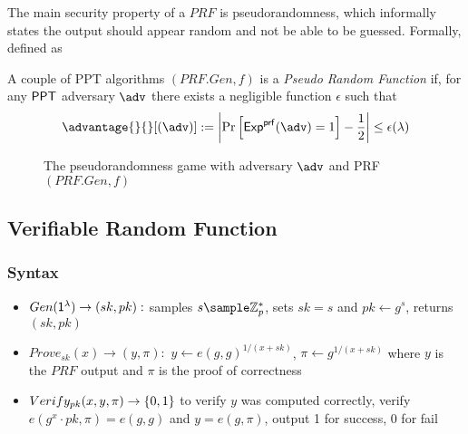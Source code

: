 The main security property of a $PRF$ is pseudorandomness, which informally states the output should appear random and not be able to be guessed. Formally, defined as

\begin{definition}[Pseudorandomness]
    A couple of PPT algorithms $(PRF.Gen, f)$ is a \textit{Pseudo Random Function} if, for any $\mathsf{PPT}$ adversary $\adv$ there exists a negligible function $\epsilon$ such that 
    \[
    \advantage{}{}[(\adv)] := 
        \left|
    \Pr     \left[ 
                \mathsf{Exp}^{\mathsf{prf}}(\adv) = 1
            \right] - \frac{1}{2}
        \right| \leq \epsilon(\lambda)
    \]
\end{definition}

\begin{figure}
\begin{pchstack}[boxed, center, space=1em]
\end{pchstack}
  \caption{The pseudorandomness game with adversary $\adv$ and PRF $(PRF.Gen, f)$}
  \label{fig:prf}
\end{figure}


\subsection{Verifiable Random Function}

\subsubsection{Syntax}
\begin{itemize}
    \item $Gen(\mathsf{1^{\lambda}}) \to (sk, pk):$ samples $s \sample \Zp^*$, sets $sk = s$ and $pk \gets g^s$, returns $(sk, pk)$
    \item $Prove_{sk}(x) \to (y, \pi):$ $y \gets e(g,g)^{1/(x+sk)}$, $\pi \gets g^{1/(x+sk)}$ where $y$ is the $PRF$ output and $\pi$ is the proof of correctness
    \item $Verify_{pk}(x, y, \pi) \to \{0,1\}$ to verify $y$ was computed correctly, verify $e(g^x \cdot pk, \pi) = e(g,g)$ and $y = e(g, \pi)$, output 1 for success, 0 for fail
\end{itemize}

